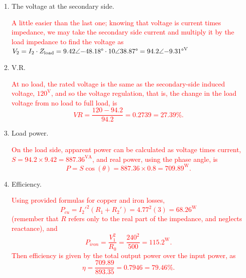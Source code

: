 \documentclass{article}
\begin{document}
\begin{enumerate}[label=\thesubsection]
\begin{enumerate}[label=\alph*)]
			\item The voltage at the secondary side.

			\textcolor{red}{A little easier than the last one; knowing that voltage is current times impedance, we may take the secondary side current and multiply it by the load impedance to find the voltage as \(V_2 = I_2\cdot Z_{\mathrm{load}} = 9.42\angle{-48.18\degree} \cdot 10\angle{38.87\degree} = 94.2\angle{-9.31\degree}^{\mathrm{V}}\)}
			\item V.R.

				\textcolor{red}{At no load, the rated voltage is the same as the secondary-side induced voltage, \(120^{\mathrm{V}}\), and so the voltage regulation, that is, the change in the load voltage from no load to full load, is 
				\[
				  VR = \frac{120 - 94.2}{94.2} = 0.2739 = 27.39\%.
			\]}
			\item Load power.

				\textcolor{red}{On the load side, apparent power can be calculated as voltage times current, \(S = 94.2 \times 9.42 = 887.36^{\mathrm{VA}}\), and real power, using the phase angle, is 
				\[
					P = S\cos{(\theta)} = 887.36 \times 0.8 = 709.89^{\mathrm{W}}.
			  \]}
			\item Efficiency.
				
				\textcolor{red}{Using provided formulas for copper and iron losses, 
				\[
					P_{cu} = I_2'^2(R_1 + R_2') = 4.77^2(3) = 68.26^{\mathrm{W}} 
				\] (remember that \(R\) refers only to the real part of the impedance, and neglects reactance), and 
				\[
					P_{iron} = \frac{V_1^2}{R_0} = \frac{240^2}{500} = 115.2^{\mathrm{W}}. 
				\]
				Then efficiency is given by the total output power over the input power, as
				\[
				  \eta = \frac{709.89}{893.35} = 0.7946 = 79.46\%.
			\]}
		\end{enumerate}
\end{enumerate}
\end{document}
